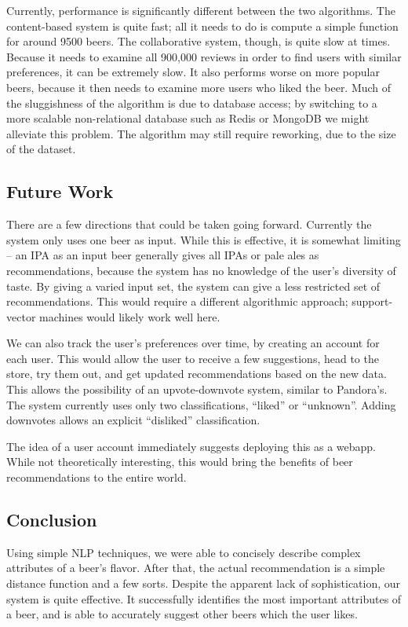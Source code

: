 \documentclass[11pt]{article}
\begin{document}
Currently, performance is significantly different between the two algorithms. The content-based system is quite fast; all it needs to do is compute a simple function for around 9500 beers. The collaborative system, though, is quite slow at times. Because it needs to examine all 900,000 reviews in order to find users with similar preferences, it can be extremely slow. It also performs worse on more popular beers, because it then needs to examine more users who liked the beer. Much of the sluggishness of the algorithm is due to database access; by switching to a more scalable non-relational database such as Redis or MongoDB we might alleviate this problem. The algorithm may still require reworking, due to the size of the dataset.

\subsection*{Future Work}
There are a few directions that could be taken going forward. Currently the system only uses one beer as input. While this is effective, it is somewhat limiting -- an IPA as an input beer generally gives all IPAs or pale ales as recommendations, because the system has no knowledge of the user's diversity of taste. By giving a varied input set, the system can give a less restricted set of recommendations. This would require a different algorithmic approach; support-vector machines would likely work well here.

We can also track the user's preferences over time, by creating an account for each user. This would allow the user to receive a few suggestions, head to the store, try them out, and get updated recommendations based on the new data. This allows the possibility of an upvote-downvote system, similar to Pandora's. The system currently uses only two classifications, ``liked'' or ``unknown''. Adding downvotes allows an explicit ``disliked'' classification.

The idea of a user account immediately suggests deploying this as a webapp. While not theoretically interesting, this would bring the benefits of beer recommendations to the entire world.

\subsection*{Conclusion}
Using simple NLP techniques, we were able to concisely describe complex attributes of a beer's flavor. After that, the actual recommendation is a simple distance function and a few sorts. Despite the apparent lack of sophistication, our system is quite effective. It successfully identifies the most important attributes of a beer, and is able to accurately suggest other beers which the user likes.
\end{document}
